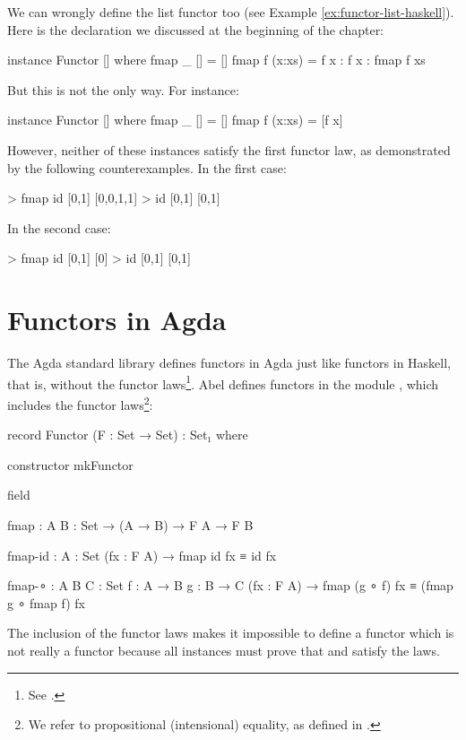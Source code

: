 \begin{example}
  \label{ex:functor-bad-list-haskell}

  We can wrongly define the list functor too (see Example
  \ref{ex:functor-list-haskell}). Here is the declaration we discussed
  at the beginning of the chapter:
  \begin{codehaskell}
instance Functor [] where
  fmap _ []     = []
  fmap f (x:xs) = f x : f x : fmap f xs
  \end{codehaskell}
  But this is not the only way. For instance:
  \begin{codehaskell}
instance Functor [] where
  fmap _ []     = []
  fmap f (x:xs) = [f x]
  \end{codehaskell}
  However, neither of these instances satisfy the first functor law,
  as demonstrated by the following counterexamples. In the first case:
  \begin{codehaskell}
> fmap id [0,1]
[0,0,1,1]
> id [0,1]
[0,1]
  \end{codehaskell}
  In the second case:
  \begin{codehaskell}
> fmap id [0,1]
[0]
> id [0,1]
[0,1]
  \end{codehaskell}

\end{example}

\section{Functors in Agda}
\label{sec:functors-agda}

The Agda standard library defines functors in Agda just like functors
in Haskell, that is, without the functor laws\footnote{See
  \parencite[module ]{danielsson-2013}.}.
Abel defines functors in the module ,
which includes the functor laws\footnote{We refer to propositional
  (intensional) equality, as defined in \parencite[module
    ]{danielsson-2013}.}:
\begin{codeagda}
record Functor (F : Set → Set) : Set₁ where

  constructor mkFunctor

  field

    fmap    : {A B : Set} → (A → B) → F A → F B

    fmap-id : {A : Set} (fx : F A) → fmap id fx ≡ id fx

    fmap-∘  : {A B C : Set} {f : A → B} {g : B → C}
              (fx : F A) → fmap (g ∘ f) fx ≡ (fmap g ∘ fmap f) fx
\end{codeagda}
The inclusion of the functor laws makes it impossible to define a
functor which is not really a functor because all instances must prove
that  and  satisfy the laws.


